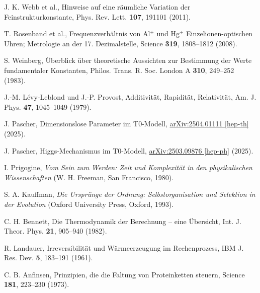\documentclass[twocolumn,aps,prl]{revtex4-2}
\begin{document}
{{{{{{{{{{{{{{{{\begin{thebibliography}{99}
																				 J. K. Webb et al., Hinweise auf eine räumliche Variation der Feinstrukturkonstante, Phys. Rev. Lett. \textbf{107}, 191101 (2011).
																				
																				 T. Rosenband et al., Frequenzverhältnis von Al$^+$ und Hg$^+$ Einzelionen-optischen Uhren; Metrologie an der 17. Dezimalstelle, Science \textbf{319}, 1808--1812 (2008).
																				
																				 S. Weinberg, Überblick über theoretische Aussichten zur Bestimmung der Werte fundamentaler Konstanten, Philos. Trans. R. Soc. London A \textbf{310}, 249--252 (1983).
																				
																				 J.-M. Lévy-Leblond und J.-P. Provost, Additivität, Rapidität, Relativität, Am. J. Phys. \textbf{47}, 1045--1049 (1979).
																				
																				 J. Pascher, Dimensionslose Parameter im T0-Modell, \href{https://github.com/jpascher/T0-Time-Mass-Duality/tree/main/2/pdf/Deutsch/DimensionsloseParameterT0.pdf}{arXiv:2504.01111 [hep-th]} (2025).
																				
																				 J. Pascher, Higgs-Mechanismus im T0-Modell, \href{https://github.com/jpascher/T0-Time-Mass-Duality/tree/main/2/pdf/Deutsch/HiggsT0.pdf}{arXiv:2503.09876 [hep-ph]} (2025).
																				
																				 I. Prigogine, \textit{Vom Sein zum Werden: Zeit und Komplexität in den physikalischen Wissenschaften} (W. H. Freeman, San Francisco, 1980).
																				
																				 S. A. Kauffman, \textit{Die Ursprünge der Ordnung: Selbstorganisation und Selektion in der Evolution} (Oxford University Press, Oxford, 1993).
																				
																				 C. H. Bennett, Die Thermodynamik der Berechnung – eine Übersicht, Int. J. Theor. Phys. \textbf{21}, 905--940 (1982).
																				
																				 R. Landauer, Irreversibilität und Wärmeerzeugung im Rechenprozess, IBM J. Res. Dev. \textbf{5}, 183--191 (1961).
																				
																				 C. B. Anfinsen, Prinzipien, die die Faltung von Proteinketten steuern, Science \textbf{181}, 223--230 (1973).
																				

\end{thebibliography}}}}}}}}}}}}}}}}}
\end{document}
